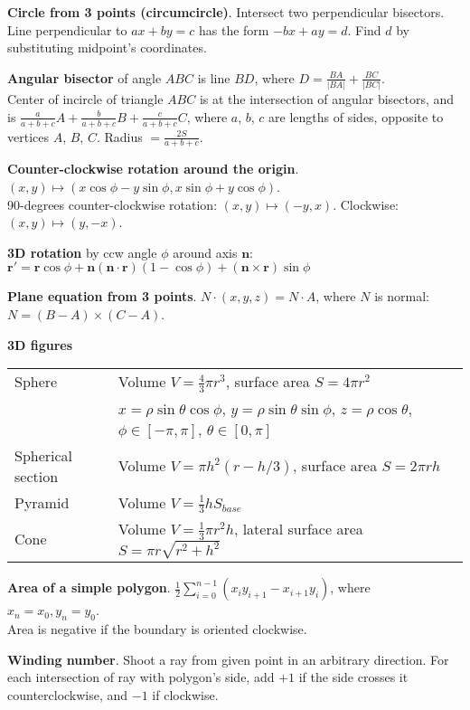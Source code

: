 \documentclass[a4paper, 12pt]{article}
\newcommand{\Topic}[1]{\textbf{#1}}
\begin{document}
\Topic{Circle from 3 points (circumcircle)}.  Intersect two perpendicular bisectors.
Line perpendicular to $ax+by=c$ has the form $-bx+ay=d$.
Find $d$ by substituting midpoint's coordinates.

\Topic{Angular bisector} of angle $ABC$ is line $BD$, where $D = \frac{BA}{|BA|} + \frac{BC}{|BC|}$. \\
Center of incircle of triangle $ABC$ is at the intersection of angular
bisectors, and is $\frac{a}{a+b+c} A + \frac{b}{a+b+c} B + \frac{c}{a+b+c} C$,
where $a$, $b$, $c$ are lengths of sides, opposite to vertices $A$, $B$, $C$.
Radius $= \frac{2S}{a+b+c}$.


\Topic{Counter-clockwise rotation around the origin}.
$(x, y) \mapsto (x \cos \phi - y \sin \phi, x \sin \phi + y \cos \phi)$. \\
90-degrees counter-clockwise rotation: $(x, y) \mapsto (-y, x)$.
Clockwise: $(x, y) \mapsto (y, -x)$.

\Topic{3D rotation} by ccw angle $\phi$ around axis $\mathbf{n}$:
$\mathbf{r}' =
   \mathbf{r} \cos\phi +
   \mathbf{n} (\mathbf{n} \cdot \mathbf{r}) (1 - \cos\phi) +
   (\mathbf{n} \times \mathbf{r}) \sin\phi$

\Topic{Plane equation from 3 points}.
$N \cdot (x, y, z) = N \cdot A$,
where $N$ is normal: $N = (B - A) \times (C - A)$.

\Topic{3D figures} \\
\begin{tabular}{ll}
  Sphere & Volume $V=\frac{4}{3} \pi r^3$, surface area $S=4 \pi r^2$ \\
         &
            $x = \rho \sin \theta \cos \phi$,
            $y = \rho \sin \theta \sin \phi$,
            $z = \rho \cos \theta$,
            $\phi \in [-\pi, \pi]$,
            $\theta \in [0, \pi]$ \\
  Spherical section &
    Volume $V = \pi h^2 (r - h/3)$,
	surface area $S = 2 \pi r h$ \\
  Pyramid &
    Volume $V=\frac{1}{3} h S_{base}$ \\
  Cone &
    Volume $V=\frac{1}{3} \pi r^2 h$,
    lateral surface area $S = \pi r \sqrt{r^2+h^2}$
\end{tabular}

\Topic{Area of a simple polygon}.
$\frac{1}{2}\sum_{i=0}^{n-1} (x_i y_{i+1} - x_{i+1} y_i)$,
where $x_n=x_0, y_n=y_0$. \\
Area is negative if the boundary is oriented clockwise.

\Topic{Winding number}. Shoot a ray from given point in an arbitrary direction.
For each intersection of ray with polygon's side, add $+1$ if the side crosses
it counterclockwise, and $-1$ if clockwise.
\end{document}
